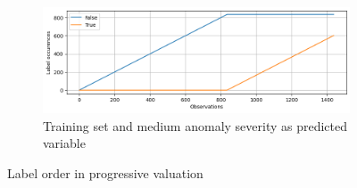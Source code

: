 \begin{figure}[ht]
\begin{subfigure}[b]{0.49\textwidth}
    \end{subfigure}
    \hfill
    \begin{subfigure}[b]{0.49\textwidth}
        \includegraphics[width=\textwidth]{assets/design/Online-event-ordering-anomaly60-test.png}
        \caption{Training set and medium anomaly severity as predicted variable}
    \end{subfigure}
    \caption{Label order in progressive valuation}
\end{figure}


